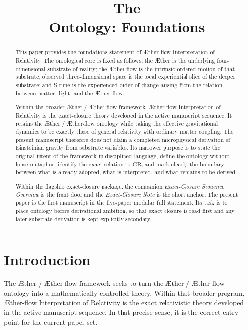 \documentclass[11pt]{article}
\title{The \TheoryName{}\\[0.4em]
Ontology: Foundations}
\author{}
\date{}
\newcommand{\Aether}{\AE{}ther}
\newcommand{\Aflow}{\AE{}ther-flow}
\newcommand{\TheoryName}{\Aflow{} Interpretation of Relativity}
\newcommand{\TheoryProgram}{\Aether{} / \Aflow{} framework}
\begin{document}
\AetherFlowAPATitlePage

\begin{abstract}
This paper provides the foundations statement of \TheoryName{}. The ontological core is fixed as follows: the \Aether{} is the underlying four-dimensional substrate of reality; the \Aflow{} is the intrinsic ordered motion of that substrate; observed three-dimensional space is the local experiential slice of the deeper substrate; and S-time is the experienced order of change arising from the relation between matter, light, and the \Aflow{}.

Within the broader \TheoryProgram{}, \TheoryName{} is the exact-closure theory developed in the active manuscript sequence. It retains the \Aether{} / \Aflow{} ontology while taking the effective gravitational dynamics to be exactly those of general relativity with ordinary matter coupling. The present manuscript therefore does not claim a completed microphysical derivation of Einsteinian gravity from substrate variables. Its narrower purpose is to state the original intent of the framework in disciplined language, define the ontology without loose metaphor, identify the exact relation to GR, and mark clearly the boundary between what is already adopted, what is interpreted, and what remains to be derived.

Within the flagship exact-closure package, the companion \emph{Exact-Closure Sequence Overview} is the front door and the \emph{Exact-Closure Note} is the short anchor. The present paper is the first manuscript in the five-paper modular full statement. Its task is to place ontology before derivational ambition, so that exact closure is read first and any later substrate derivation is kept explicitly secondary.
%
\end{abstract}

\section{Introduction}

The \TheoryProgram{} seeks to turn the \Aether{} / \Aflow{} ontology into a mathematically controlled theory. Within that broader program, \TheoryName{} is the exact relativistic theory developed in the active manuscript sequence. In that precise sense, it is the correct entry point for the current paper set.
\end{document}
